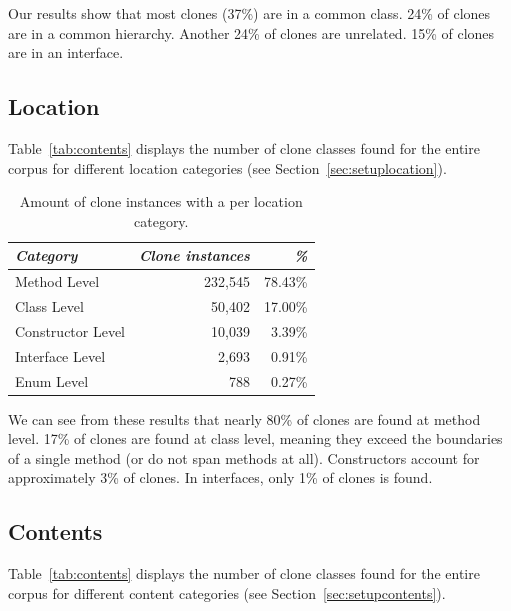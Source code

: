 \documentclass[runningheads]{llncs}
\begin{document}
Our results show that most clones (37\%) are in a common class. 24\% of clones are in a common hierarchy. Another 24\% of clones are unrelated. 15\% of clones are in an interface.

\subsection{Location}
Table~\ref{tab:contents} displays the number of clone classes found for the entire corpus for different location categories (see Section~\ref{sec:setuplocation}).

\begin{table}[H]
\centering
\begin{tabular}{@{}lrr@{}}
\toprule
\textit{\textbf{Category}} & \textit{\textbf{Clone instances}} & \textit{\textbf{\%}} \\ \midrule
Method Level & 232,545 & 78.43\% \\
Class Level & 50,402 & 17.00\% \\
Constructor Level & 10,039 & 3.39\% \\
Interface Level & 2,693 & 0.91\% \\
Enum Level & 788 & 0.27\% \\
\end{tabular}
\caption{Amount of clone instances with a per location category.}
\label{tab:location}
\end{table}

We can see from these results that nearly 80\% of clones are found at method level. 17\% of clones are found at class level, meaning they exceed the boundaries of a single method (or do not span methods at all). Constructors account for approximately 3\% of clones. In interfaces, only 1\% of clones is found.

\subsection{Contents}
Table~\ref{tab:contents} displays the number of clone classes found for the entire corpus for different content categories (see Section~\ref{sec:setupcontents}).
\end{document}

